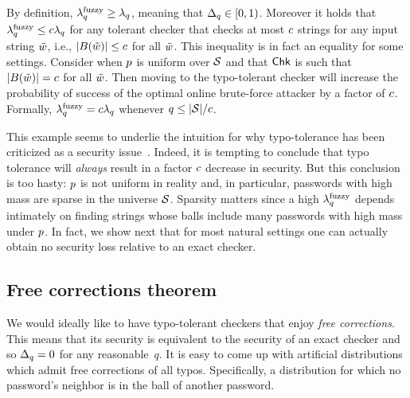 
By definition, $\lambda^\textnormal{fuzzy}_q \ge \lambda_q$, meaning that $\Delta_q \in
[0,1)$. Moreover it holds that $\lambda^\textnormal{fuzzy}_q \le c\lambda_q$ for any tolerant checker that
checks at most $c$ strings for any input string $\tilde{w}$, i.e., 
$|B(\tilde{w})| \le c$ for all $\tilde{w}$. 
This inequality is in fact an equality for some
settings. 
Consider when $p$ is uniform over $\mathcal{S}$ and that
$\textnormal{\textsf{Chk}}$ is such that $|B(\tilde{w})| = c$ for all $\tilde{w}$. Then
moving to the typo-tolerant checker will increase the probability of success of
the optimal online brute-force attacker by a factor of
$c$. Formally, $\lambda^\textnormal{fuzzy}_q = c \lambda_q$ whenever $q \le
|\mathcal{S}|/c$. 


This example seems to underlie the intuition for why typo-tolerance has been
criticized as a security issue~\cite{zdnet2011Facebook,vanguard15i}.
Indeed, it is tempting to conclude that typo tolerance will \emph{always} result in a
factor $c$ decrease in security. But this conclusion is too hasty:
$p$ is not uniform in reality and, in particular, passwords with high
mass are sparse in the universe $\mathcal{S}$. Sparsity matters since a high
$\lambda^\textnormal{fuzzy}_q$ depends intimately on finding strings whose balls include many
passwords with high mass under $p$.  In fact, we show next that for most
natural settings one can actually obtain no security loss relative to an exact
checker. 

\subsection{Free corrections theorem} 
\label{sec:free-thm}
We would ideally like to have typo-tolerant checkers that
enjoy \emph{free corrections}. This means that  
its security is equivalent to the security of an exact checker and 
so $\Delta_q = 0$ for any reasonable~$q$.  
It is easy to come up with artificial distributions 
which admit free corrections of all typos. Specifically, a distribution for
which no password's neighbor is in the ball of another password. 

